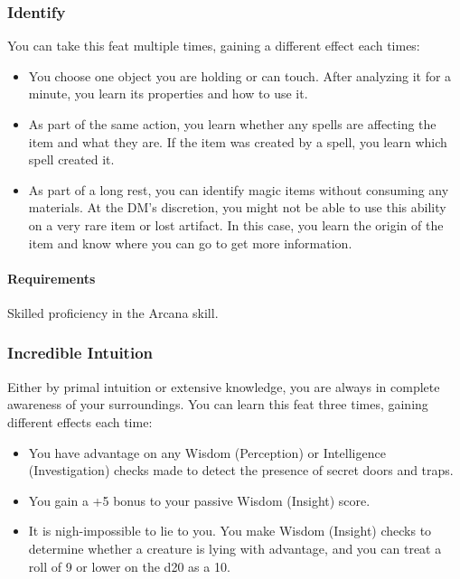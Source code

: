 \subsubsection{Identify} \label{feat::identify}
    You can take this feat multiple times, gaining a different effect each times:
    \begin{itemize}
        \item You choose one object you are holding or can touch.
        After analyzing it for a minute, you learn its properties and how to use it.
        \item As part of the same action, you learn whether any spells are affecting the item and what they are.
        If the item was created by a spell, you learn which spell created it.
        \item As part of a long rest, you can identify magic items without consuming any materials.
        At the DM's discretion, you might not be able to use this ability on a very rare item or lost artifact.
        In this case, you learn the origin of the item and know where you can go to get more information.
    \end{itemize}
    \paragraph{Requirements} Skilled proficiency in the Arcana skill.
\subsubsection{Incredible Intuition} \label{feat::incredibleintuition}
    Either by primal intuition or extensive knowledge, you are always in complete awareness of your surroundings.
    You can learn this feat three times, gaining different effects each time:
    \begin{itemize}
        \item You have advantage on any Wisdom (Perception) or Intelligence (Investigation) checks made to detect the presence of secret doors and traps.
        \item You gain a +5 bonus to your passive Wisdom (Insight) score.
        \item It is nigh-impossible to lie to you.
        You make Wisdom (Insight) checks to determine whether a creature is lying with advantage, and you can treat a roll of 9 or lower on the d20 as a 10.
    \end{itemize}
